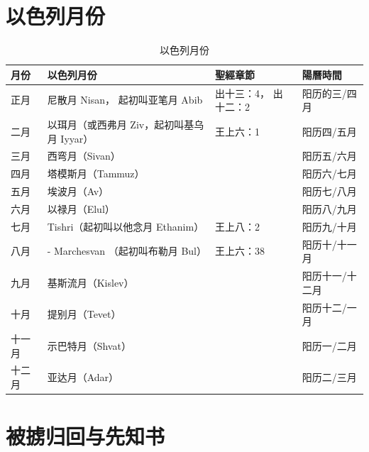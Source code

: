  \section{以色列月份}
\begin{table}[!hbp]
\centering 
\begin{tabular}{|p{1.2cm}|p{7cm}|p{3.6cm}|p{2.8cm}|}
\hline
\hline
月份　&以色列月份&聖經章節&陽曆時間\\\hline
正月 &尼散月 Nisan， 起初叫亚笔月 Abib&出十三：4， 出十二：2&阳历的三/四月\\\hline
二月 & 以珥月（或西弗月 Ziv，起初叫基乌月 Iyyar）&王上六：1&阳历四/五月\\\hline
三月 &西弯月（Sivan）&&阳历五/六月\\\hline
四月 & 塔模斯月（Tammuz）&&阳历六/七月\\\hline
五月& 埃波月（Av）&&阳历七/八月\\\hline
六月& 以禄月（Elul）&&阳历八/九月\\\hline
七月& Tishri（起初叫以他念月 Ethanim）&王上八：2&阳历九/十月\\\hline
八月 &- Marchesvan （起初叫布勒月 Bul）&王上六：38&阳历十/十一月\\\hline
九月& 基斯流月（Kislev）&&阳历十一/十二月\\\hline
十月 & 提别月（Tevet）&&阳历十二/一月\\\hline
十一月 & 示巴特月（Shvat）&&阳历一/二月\\\hline
十二月&亚达月（Adar）&&阳历二/三月\\\hline
\end{tabular}
\caption{以色列月份}
\end{table}


 \section{被掳归回与先知书}
